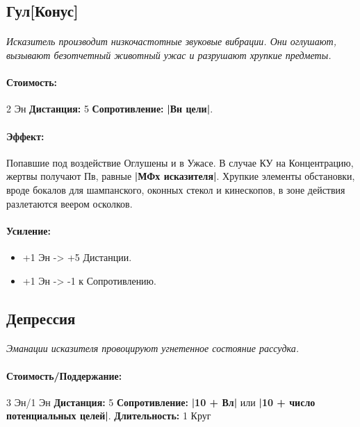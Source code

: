 \subsection{Гул[Конус]}
\paragraph{} 
\textit{Исказитель производит низкочастотные звуковые вибрации. Они оглушают, вызывают безотчетный животный ужас и разрушают хрупкие предметы.}
\paragraph{Стоимость: }2 Эн
\newline
\textbf{Дистанция: }5
\newline
\textbf{Сопротивление: }
\textbf{|Вн цели|}.
\paragraph{Эффект: }Попавшие под воздействие Оглушены и в Ужасе. В случае КУ на Концентрацию, жертвы получают Пв, равные 
\textbf{|МФх исказителя|}. 
\newline Хрупкие элементы обстановки, вроде бокалов для шампанского, оконных стекол и кинескопов, в зоне действия разлетаются веером осколков.
\paragraph{Усиление:}
\begin{itemize}
\item+1 Эн -> +5 Дистанции.
\item+1 Эн -> -1 к Сопротивлению.
\end{itemize}
\subsection{Депрессия}
\paragraph{} 
\textit{Эманации исказителя провоцируют угнетенное состояние рассудка.}
\paragraph{Стоимость/Поддержание: }3 Эн/1 Эн
\newline
\textbf{Дистанция: }5
\newline
\textbf{Сопротивление: }
\textbf{|10 + Вл|} или 
\textbf{|10 + число потенциальных целей|}.
\tbd
\newline 
\textbf{Длительность: }1 Круг
